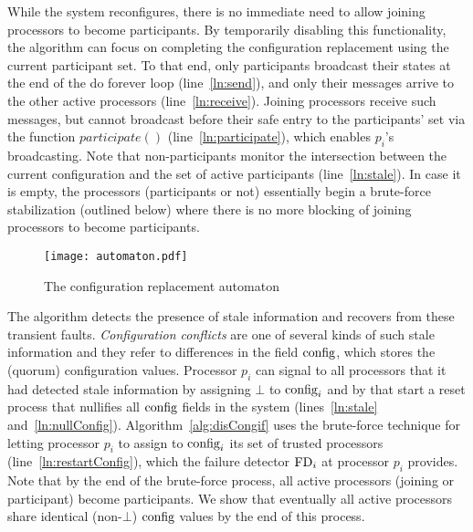 \documentclass[11pt]{article}
\begin{document}
While the system reconfigures, there is no immediate need to allow joining processors to become participants. By temporarily disabling this functionality, the algorithm can focus on completing the configuration replacement using the current participant set. To that end, 
only participants broadcast their states at the end of the do forever loop (line~\ref{ln:send}), and only their messages arrive to the other active processors (line~\ref{ln:receive}). Joining processors receive such messages, but cannot broadcast before their safe entry to the participants' set via the function $participate()$ (line~\ref{ln:participate}), which enables $p_i$'s broadcasting. 
Note that non-participants monitor the intersection between the current configuration and the set of active participants (line~\ref{ln:stale}). In case it is empty, the processors (participants or not) essentially begin a brute-force stabilization (outlined below) where there is no more blocking of joining processors to become participants.









\begin{figure*}[t!] 
\center
	\texttt{[image: automaton.pdf]}
	\caption{The configuration replacement automaton}
	\label{fig:auto}
\end{figure*} 


The algorithm detects the presence of stale information and recovers from these transient faults. {\em Configuration conflicts} are one of several kinds of such stale information and they refer to differences in the field $\textnormal{config}$, which stores the (quorum) configuration values. Processor $p_i$ can signal to all processors that it had detected stale information by assigning $\bot$ to $\textnormal{config}_i$ and by that start a reset process that nullifies all $\textnormal{config}$ fields in the system (lines~\ref{ln:stale} and~\ref{ln:nullConfig}). 
Algorithm~\ref{alg:disCongif} uses the brute-force technique for letting processor $p_i$ to assign to $\textnormal{config}_i$ its set of trusted processors (line~\ref{ln:restartConfig}), which the failure detector $\textnormal{FD}_i$ at processor $p_i$ provides. Note that by the end of the brute-force process, all active processors (joining or participant) become  participants. We show that 
eventually all active processors share identical (non-$\bot$) $\textnormal{config}$ values by the end of this process.
\end{document}
